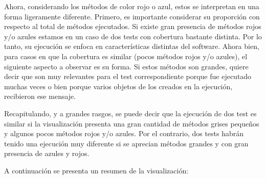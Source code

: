 \par Ahora, considerando los métodos de color rojo o azul, estos se interpretan en una forma ligeramente diferente. Primero, es importante considerar su proporción con respecto al total de métodos ejecutados. Si existe gran presencia de métodos rojos y/o azules estamos en un caso de dos tests con cobertura bastante distinta. Por lo tanto, su ejecución se enfoca en características distintas del software. Ahora bien, para casos en que la cobertura es similar (pocos métodos rojos y/o azules), el siguiente aspecto a observar es su forma. Si estos métodos son grandes, quiere decir que son muy relevantes para el test correspondiente porque fue ejecutado muchas veces o bien porque varios objetos de los creados en la ejecución, recibieron ese mensaje.

\par Recapitulando, y a grandes rasgos, se puede decir que la ejecución de dos test es similar si la visualización presenta una gran cantidad de métodos grises pequeños y algunos pocos métodos rojos y/o azules. Por el contrario, dos tests habrán tenido una ejecución muy diferente si se aprecian métodos grandes y con gran presencia de azules y rojos. 

\par A continuación se presenta un resumen de la visualización:

